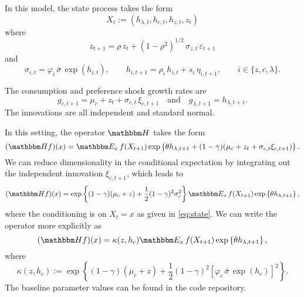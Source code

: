 \documentclass[12pt, reqno]{amsart}
\newcommand{\1}{\mathbbm 1}
\newcommand{\HH}{\mathbbm H}
\newcommand{\EE}{\mathbbm E}
\renewcommand{\phi}{\varphi}
\renewcommand{\epsilon}{\varepsilon}
\theoremstyle{plain}
\theoremstyle{definition}
\begin{document}
In this model, the state process takes the form 
%
\begin{equation}\label{eq:state}
    X_t := (h_{\lambda, t}, h_{c, t}, h_{z, t}, z_t)  
\end{equation}
%
where
\begin{equation*}
    z_{t+1} = \rho \, z_t + (1 - \rho^2)^{1/2} \, \sigma_{z, t} \, \epsilon_{t+1}
\end{equation*}
%
and
%
\begin{equation*}
    \sigma_{i,t} = \phi_i \, \bar{\sigma} \, \exp(h_{i,t}),
    \qquad
    h_{i, t+1} = \rho_i \, h_{i,t} + s_{i} \, \eta_{i, t+1},
    \qquad
    i \in \{z, c, \lambda\}.
\end{equation*}

The consumption and preference shock growth rates are
%
\begin{equation}\label{eq:ssygc}
    g_{c, t+1}
    = \mu_c + z_t + \sigma_{c, t} \, \xi_{c, t+1} 
    \quad \text{and} \quad
    g_{\lambda, t+1} = h_{\lambda, t+1}.
\end{equation}
%
The innovations are all independent and standard normal.  

In this setting, the operator $\HH$ takes the form
%
\begin{equation*}
    (\HH f)(x)
    = \EE_x
        \, f(X_{t+1}) 
        \exp \left\{
            \theta h_{\lambda, t+1}
            + (1-\gamma)(\mu_c + z_t + \sigma_{c, t} \xi_{c, t+1})
        \right\}.
\end{equation*}
%
We can reduce dimensionality in the conditional expectation by integrating out
the independent innovation $\xi_{c, t+1}$, which leads to 
%
\begin{equation}
    (\HH f)(x)
    = \exp \left\{
            (1-\gamma)(\mu_c + z)
            + \frac{1}{2} (1-\gamma)^2 \sigma_c^2 
        \right\}
        \EE_x \, f(X_{t+1}) 
        \exp \left\{
            \theta h_{\lambda, t+1}
        \right\},
\end{equation}
%
where the conditioning is on $X_t = x$ as given in \eqref{eq:state}.
We can write the operator more explicitly as
%
\begin{equation}
    (\HH f)(x)
    = \kappa(z, h_c)
        \EE_x \, f(X_{t+1}) 
        \exp \left\{
            \theta h_{\lambda, t+1}
        \right\},
\end{equation}
%
where
%
\begin{equation}\label{eq:kap}
    \kappa(z, h_c) 
     := \exp \left\{
            (1-\gamma)(\mu_c + z)
            + \frac{1}{2} (1-\gamma)^2 
            [\phi_c \, \bar{\sigma} \, \exp(h_c)]^2 
        \right\}.
\end{equation}
%
The baseline parameter values can be found in the code repository.
\end{document}
